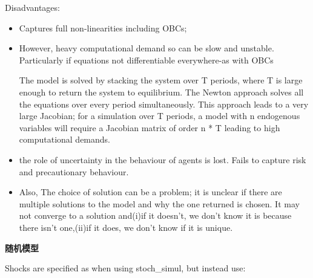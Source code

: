 \documentclass[cn,10pt,math=newtx,citestyle=gb7714-2015,bibstyle=gb7714-2015]{elegantbook}
\begin{document}
Disadvantages:

\begin{itemize}
	\item Captures full non-linearities including OBCs;
	\item However, heavy computational demand so can be slow and unstable. Particularly if equations not differentiable everywhere-as with OBCs
	
	The model is solved by stacking the system over T periods, where T is large enough to return the system to equilibrium. The Newton approach solves all the equations over every period simultaneously. This approach leads to a very large Jacobian; for a simulation over T periods, a model with n endogenous variables will require a Jacobian matrix of order n * T leading to high computational demands.
	\item the role of uncertainty in the behaviour of agents is lost. Fails to capture risk and precautionary behaviour.
	\item Also, The choice of solution can be a problem; it is unclear if there are multiple solutions to the model and why the one returned is chosen. It may not converge to a solution and(i)if it doesn't, we don't know it is because there isn't one,(ii)if it does, we don't know if it is unique.
	
\end{itemize}


\textbf{随机模型}

Shocks are specified as when using stoch\_simul, but instead use:
\end{document}
